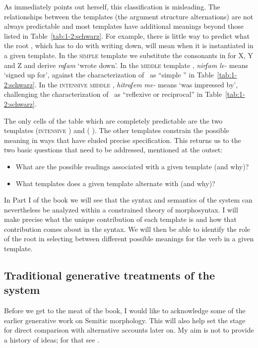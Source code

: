 \begin{exe}
\begin{xlist}
\begin{exe}
\begin{exe}
\begin{exe}
\begin{exe}
\begin{xlist}
\begin{exe}
\begin{xlist}
\begin{xlist}
\begin{xlist}
\begin{exe}
\begin{xlist}
As \citeauthor{schwarzwald81} immediately points out herself, this classification is misleading. The relationships between the templates (the argument structure alternations) are not always predictable and most templates have additional meanings beyond those listed in Table~\ref{tab:1-2:schwarz}. For example, there is little way to predict what the root , which has to do with writing down, will mean when it is instantiated in a given template. In the \textsc{simple} template {\tkal} we substitute the consonants in  for X, Y and Z and derive \emph{raʃam} `wrote down'. In the \textsc{middle} template \tnif, \emph{nirʃam le-} means `signed up for', against the characterization of \tnif~as ``simple '' in Table~\ref{tab:1-2:schwarz}. In the \textsc{intensive middle} \thit, \emph{hitraʃem me-} means `was impressed by', challenging the characterization of \thit~as ``reflexive or reciprocal'' in Table~\ref{tab:1-2:schwarz}. 

The only cells of the table which are completely predictable are the two  templates {\tpua} (\textsc{intensive }) and {\thuf} (\textsc{ }). The other templates constrain the possible meaning in ways that have eluded precise specification. This returns us to the two basic questions that need to be addressed, mentioned at the outset:

\begin{itemize}
	\item What are the possible readings associated with a given template (and why)?
	\item What templates does a given template alternate with (and why)?
\end{itemize}

In Part I of the book we will see that the syntax and semantics of the system can nevertheless be analyzed within a constrained theory of morphosyntax. I will make precise what the unique contribution of each template is and how that contribution comes about in the syntax. We will then be able to identify the role of the root in selecting between different possible meanings for the verb in a given template.


	\subsection{Traditional generative treatments of the system} \label{intro:basic:jjmcc}
Before we get to the meat of the book, I would like to acknowledge some of the earlier generative work on Semitic morphology. This will also help set the stage for direct comparison with alternative accounts later on. My aim is not to provide a history of ideas; for that see \cite{kastnertucker19cup}.


\end{xlist}
\end{exe}
\end{xlist}
\end{xlist}
\end{xlist}
\end{exe}
\end{xlist}
\end{exe}
\end{exe}
\end{exe}
\end{exe}
\end{xlist}
\end{exe}
